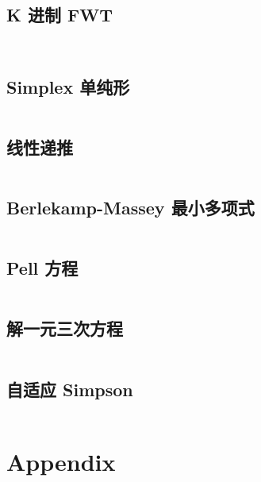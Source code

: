\documentclass[titlepage, a4paper]{article}
\newcommand\nothing{}
\renewcommand{\checkmark}[0]{\nothing}
\begin{document}
\begin{multicols}{2}
\begin{spacing}{0.6}
				\subsection{K 进制 FWT}
				\inputminted{cpp}{src/tbr/fwt.cpp}
				
				\inputminted{cpp}{src/Math/Polynomial.cpp}
				
				\subsection{Simplex 单纯形\checkmark}
				\inputminted{cpp}{src/Math/Simplex.cpp}
				\subsection{线性递推}
				\inputminted{cpp}{src/Math/线性递推.cpp}
				\subsection{Berlekamp-Massey 最小多项式}
				\inputminted{cpp}{src/Math/Berlekamp-Massey.cpp}
				\subsection{Pell 方程}
				\inputminted{cpp}{src/Math/Pell方程.cpp}
				\subsection{解一元三次方程}
				\inputminted{cpp}{src/Math/解一元三次方程.cpp}
				\subsection{自适应 Simpson}
				\inputminted{cpp}{src/Math/Simpson.cpp}
		
			
			\section{Appendix}
				\begin{spacing}{0.5}

\end{spacing}
\end{spacing}
\end{multicols}
\end{document}
